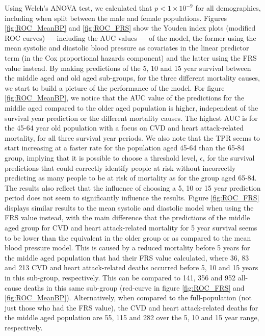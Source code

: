 \documentclass[
]{article}
\begin{document}
Using Welch's ANOVA test, we calculated that \(p<1\times 10^{-9}\) for all demographics, including when split between the male and female populations. Figures \ref{fig:ROC_MeanBP} and \ref{fig:ROC_FRS} show the Youden index plots (modified ROC curves) --- including the AUC values --- of the model, the former using the mean systolic and diastolic blood pressure as covariates in the linear predictor term (in the Cox proportional hazards component) and the latter using the FRS value instead. By making predictions of the 5, 10 and 15 year survival between the middle aged and old aged sub-groups, for the three different mortality causes, we start to build a picture of the performance of the model. For figure \ref{fig:ROC_MeanBP}, we notice that the AUC value of the predictions for the middle aged compared to the older aged population is higher, independent of the survival year prediction or the different mortality causes. The highest AUC is for the 45-64 year old population with a focus on CVD and heart attack-related mortality, for all three survival year periods. We also note that the TPR seems to start increasing at a faster rate for the population aged 45-64 than the 65-84 group, implying that it is possible to choose a threshold level, \(\epsilon\), for the survival predictions that could correctly identify people at risk without incorrectly predicting as many people to be at risk of mortality as for the group aged 65-84. The results also reflect that the influence of choosing a 5, 10 or 15 year prediction period does not seem to significantly influence the results. Figure \ref{fig:ROC_FRS} displays similar results to the mean systolic and diastolic model when using the FRS value instead, with the main difference that the predictions of the middle aged group for CVD and heart attack-related mortality for 5 year survival seems to be lower than the equivalent in the older group or as compared to the mean blood pressure model. This is caused by a reduced mortality before 5 years for the middle aged population that had their FRS value calculated, where 36, 83 and 213 CVD and heart attack-related deaths occurred before 5, 10 and 15 years in this sub-group, respectively. This can be compared to 141, 356 and 952 all-cause deaths in this same sub-group (red-curve in figure \ref{fig:ROC_FRS} and \ref{fig:ROC_MeanBP}). Alternatively, when compared to the full-population (not just those who had the FRS value), the CVD and heart attack-related deaths for the middle aged population are 55, 115 and 282 over the 5, 10 and 15 year range, respectively.
\end{document}
